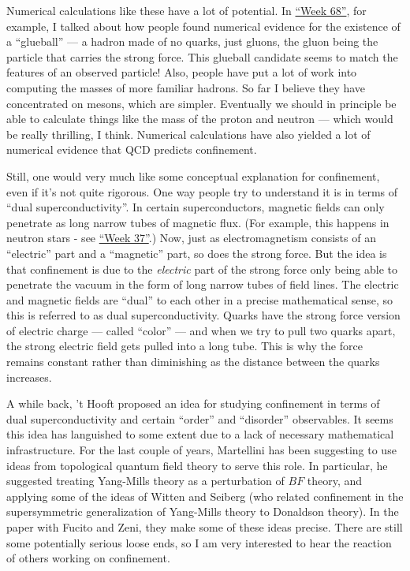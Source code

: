 \documentclass{article}
\begin{document}
Numerical calculations like these have a lot of potential. In
\protect\hyperlink{week68}{``Week 68''}, for example, I talked about how
people found numerical evidence for the existence of a ``glueball'' ---
a hadron made of no quarks, just gluons, the gluon being the particle
that carries the strong force. This glueball candidate seems to match
the features of an observed particle! Also, people have put a lot of
work into computing the masses of more familiar hadrons. So far I
believe they have concentrated on mesons, which are simpler. Eventually
we should in principle be able to calculate things like the mass of the
proton and neutron --- which would be really thrilling, I think.
Numerical calculations have also yielded a lot of numerical evidence
that QCD predicts confinement.

Still, one would very much like some conceptual explanation for
confinement, even if it's not quite rigorous. One way people try to
understand it is in terms of ``dual superconductivity''. In certain
superconductors, magnetic fields can only penetrate as long narrow tubes
of magnetic flux. (For example, this happens in neutron stars - see
\protect\hyperlink{week37}{``Week 37''}.) Now, just as electromagnetism
consists of an ``electric'' part and a ``magnetic'' part, so does the
strong force. But the idea is that confinement is due to the
\emph{electric} part of the strong force only being able to penetrate
the vacuum in the form of long narrow tubes of field lines. The electric
and magnetic fields are ``dual'' to each other in a precise mathematical
sense, so this is referred to as dual superconductivity. Quarks have the
strong force version of electric charge --- called ``color'' --- and
when we try to pull two quarks apart, the strong electric field gets
pulled into a long tube. This is why the force remains constant rather
than diminishing as the distance between the quarks increases.

A while back, 't Hooft proposed an idea for studying confinement in
terms of dual superconductivity and certain ``order'' and ``disorder''
observables. It seems this idea has languished to some extent due to a
lack of necessary mathematical infrastructure. For the last couple of
years, Martellini has been suggesting to use ideas from topological
quantum field theory to serve this role. In particular, he suggested
treating Yang-Mills theory as a perturbation of \(BF\) theory, and
applying some of the ideas of Witten and Seiberg (who related
confinement in the supersymmetric generalization of Yang-Mills theory to
Donaldson theory). In the paper with Fucito and Zeni, they make some of
these ideas precise. There are still some potentially serious loose
ends, so I am very interested to hear the reaction of others working on
confinement.
\end{document}
